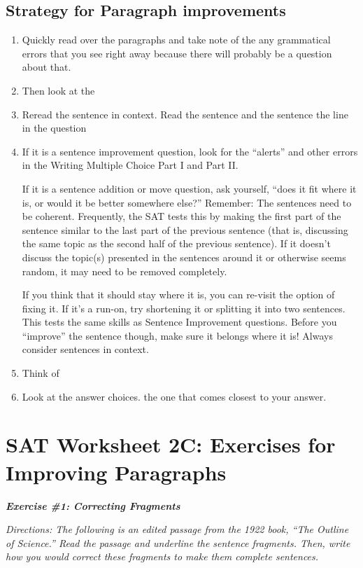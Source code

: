 \documentclass[12pt]{book}
\newcommand{\longline}{\underline{\hspace{2in}} }
\begin{document}
\subsection{Strategy for Paragraph improvements}
\begin{enumerate}
\item{Quickly read over the paragraphs and take note of the \longline any grammatical errors that you see right away because there will probably be a question about that.}
\item{Then look at the \longline}
\item{Reread the sentence in context. Read the sentence \longline and the sentence \longline the line in the question}
\item{If it is a sentence improvement question, look for the “alerts” and other errors in the Writing Multiple Choice Part I and Part II.}

\bigskip
If it is a sentence addition or move question, ask yourself, “does it fit where it is, or would it be better somewhere else?” Remember: The sentences need to be coherent. Frequently, the SAT tests this by making the first part of the sentence similar to the last part of the previous sentence (that is, discussing the same topic as the second half of the previous sentence). If it doesn't discuss the topic(s) presented in the sentences around it or otherwise seems random, it may need to be removed completely. 

\bigskip
If you think that it should stay where it is, you can re-visit the option of fixing it.  If it's a run-on, try shortening it or splitting it into two sentences.  This tests the same skills as Sentence Improvement questions.  Before you “improve” the sentence though, make sure it belongs where it is!  Always consider sentences in context.

\item{Think of \longline}

\item{Look at the answer choices.  \longline the one that comes closest to your answer.}
\end{enumerate}

\section[Improvement Practice]{SAT Worksheet 2C: Exercises for Improving Paragraphs}
\textbf{\textit{Exercise \#1: Correcting Fragments}}

\bigskip
\textit{Directions: The following is an edited passage from the 1922 book, “The Outline of Science.” Read the passage and underline the sentence fragments. Then, write how you would correct these fragments to make them complete sentences.}
\end{document}
